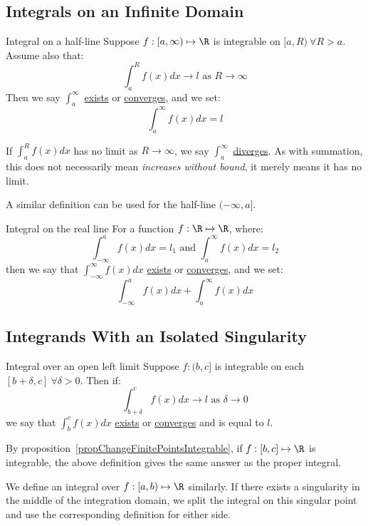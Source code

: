 \documentclass[../Main.tex]{subfiles}
\begin{document}
\subsection{Integrals on an Infinite Domain}
\begin{definition}{Integral on a half-line}
    Suppose $f : [a, \infty) \mapsto \R$ is integrable on $[a, R)~\forall R > a$. Assume also that:
    \begin{equation*}
        \int_a^R f(x) dx \to l \text{ as } R\to \infty
    \end{equation*}
    Then we say $\int_a^\infty$ \underline{exists} or \underline{converges}, and we set:
    \begin{equation*}
        \int_a^\infty f(x) dx = l
    \end{equation*}
\end{definition}
If $\int_a^R f(x) dx$ has no limit as $R \to \infty$, we say $\int_a^\infty$ \underline{diverges}. As with summation, this does not necessarily mean \textit{increases without bound}, it merely means it has no limit.

A similar definition can be used for the half-line $(-\infty, a]$.
\begin{definition}{Integral on the real line}
    For a function $f : \R \mapsto \R$, where:
    \begin{equation*}
        \int_{-\infty}^a f(x) dx = l_1 \text{ and } \int_a^\infty f(x) dx = l_2
    \end{equation*}
    then we say that $\int_{-\infty}^\infty f(x) dx$ \underline{exists} or \underline{converges}, and we set:
    \begin{equation*}
        \int_{-\infty}^a f(x) dx + \int_a^\infty f(x) dx
    \end{equation*}
\end{definition}
\subsection{Integrands With an Isolated Singularity}
\begin{definition}{Integral over an open left limit}
    Suppose $f : (b, c]$ is integrable on each $[b + \delta, c]~\forall \delta > 0$.
    Then if:
    \begin{equation*}
        \int_{b + \delta}^c f(x) dx \to l \text{ as } \delta \to 0
    \end{equation*}
    we say that $\int_b^c f(x) dx$ \underline{exists} or \underline{converges} and is equal to $l$.
\end{definition}
\begin{remark}
    By proposition~\ref{propChangeFinitePointsIntegrable}, if $f : [b, c] \mapsto \R$ is integrable, the above definition gives the same answer as the proper integral.
\end{remark}
We define an integral over $f : [a, b) \mapsto \R$ similarly. If there exists a singularity in the middle of the integration domain, we split the integral on this singular point and use the corresponding definition for either side.
\end{document}
